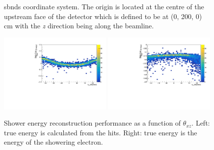 \begin{figure}[h!]
    \centering
    

    \caption[\glspl{sbnd} coordinate system]{\glspl{sbnd} coordinate system. The origin is located at the centre of the upstream face of the detector which is defined to be at (0, 200, 0) cm with the \textit{z} direction being along the beamline.}
    \label{fig:sbnd_coordinate_system}
\end{figure}


\begin{figure}
    \centering
    \includegraphics[width = 0.49\textwidth]{figures-chap4/frac_res_vs_thetaXZ_cheating_electron_vertex_plane2_cut.pdf}
    \includegraphics[width = 0.49\textwidth]{figures-chap4/frac_res_vs_thetaXZ_showeringE_cheating_electron_vertex_plane2_cut.pdf}
    \caption[Shower energy reconstruction performance as a function of $\theta_{xz}$.]{Shower energy reconstruction performance as a function of $\theta_{xz}$. Left: true energy is calculated from the hits. Right: true energy is the energy of the showering electron.}
    \label{fig:reconstruction_as_a_function_of_angle}
\end{figure}



